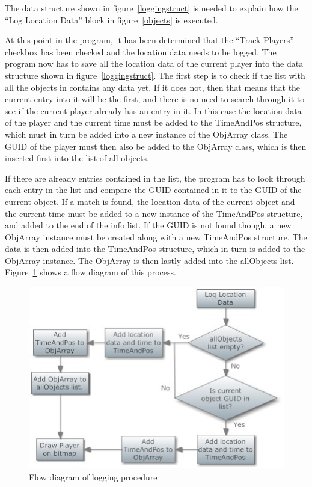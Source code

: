 The data structure shown in figure~\ref{loggingstruct} is needed to explain how the ``Log Location Data'' block in figure~\ref{objects} is executed.

At this point in the program, it has been determined that the ``Track Players'' checkbox has been checked and the location data needs to be logged. The program now has to save all the location data of the current player into the data structure shown in figure~\ref{loggingstruct}. The first step is to check if the list with all the objects in contains any data yet. 
If it does not, then that means that the current entry into it will be the first, and there is no need to search through it to see if the current player already has an entry in it. In this case the location data of the player and the current time must be added to the TimeAndPos structure, which must in turn be added into a new instance of the ObjArray class. The GUID of the player must then also be added to the ObjArray class, which is then inserted first into the list of all objects.

If there are already entries contained in the list, the program has to look through each entry in the list and compare the GUID contained in it to the GUID of the current object. If a match is found, the location data of the current object and the current time must be added to a new instance of the TimeAndPos structure, and added to the end of the info list. If the GUID is not found though, a new ObjArray instance must be created along with a new TimeAndPos structure. The data is then added into the TimeAndPos structure, which in turn is added to the ObjArray instance. The ObjArray is then lastly added into the allObjects list. Figure~\ref{logging} shows a flow diagram of this process.

\begin{figure}[htbp]  %
\centering
\includegraphics[scale = 0.65]{logging.jpg}	
\caption{Flow diagram of logging procedure}
\label{logging}
\end{figure}


